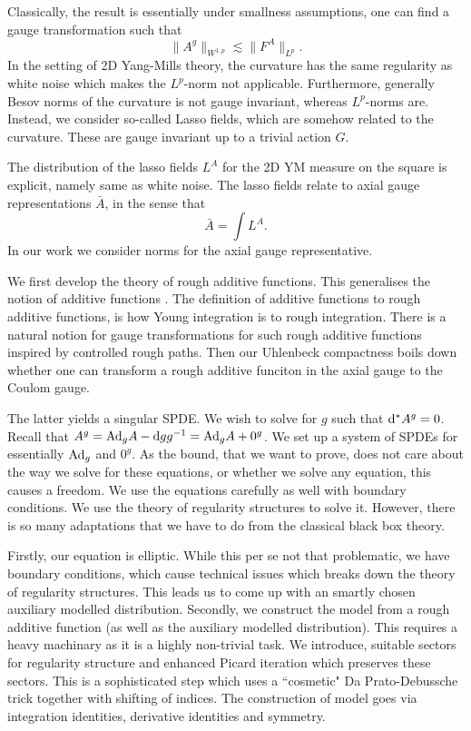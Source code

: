\documentclass[./main.tex]{subfiles}
\begin{document}
Classically, the result is essentially under smallness assumptions, one can find a gauge transformation such that 
\[
\|A^g\|_{W^{1,p}}\lesssim \|F^A\|_{L^p}.
\]
In the setting of 2D Yang-Mills theory, the curvature has the same regularity as white noise which makes the $L^p$-norm not applicable. Furthermore, generally Besov norms of the curvature is not gauge invariant, whereas $L^p$-norms are. Instead, we consider so-called Lasso fields, which are somehow related to the curvature. These are gauge invariant up to a trivial action $G$. 

The distribution of the lasso fields $L^A$ for the 2D YM measure on the square is explicit, namely same as white noise. The lasso fields relate to axial gauge representations $\bar A$, in the sense that 
\[
\bar A=\int L^A. 
\]
In our work we consider norms for the axial gauge representative. 

We first develop the theory of rough additive functions. This generalises the notion of additive functions . The definition of additive functions to rough additive functions, is how Young integration is to rough integration. There is a natural notion for gauge transformations for such rough additive functions inspired by controlled rough paths. Then our Uhlenbeck compactness boils down whether one can transform a rough additive funciton in the axial gauge to the Coulom gauge. 

The latter yields a singular SPDE. We wish to solve for $g$ such that $\mathrm{d}^*A^g=0$. Recall that $A^g=\mathrm{Ad}_gA-\mathrm{d} gg^{-1}=\mathrm{Ad}_gA+0^g$. We set up a system of SPDEs for essentially $\mathrm{Ad}_g$ and $0^g$. As the bound, that we want to prove, does not care about the way we solve for these equations, or whether we solve any equation, this causes a freedom. We use the equations carefully as well with boundary conditions. We use the theory of regularity structures to solve it. However, there is so many adaptations that we have to do from the classical black box theory. 


Firstly, our equation is elliptic. While this per se not that problematic, we have boundary conditions, which cause technical issues which breaks down the theory of regularity structures. This leads us to come up with an smartly chosen auxiliary modelled distribution.  Secondly, we construct the model from a rough additive function (as well as the auxiliary modelled distribution). This requires a heavy machinary as it is a highly non-trivial task. We introduce, suitable sectors for regularity structure and enhanced Picard iteration which preserves these sectors. This is a sophisticated step which uses a ``cosmetic" Da Prato-Debussche trick together with shifting of indices.   The construction of model goes via integration identities, derivative identities and symmetry.  
\end{document}
